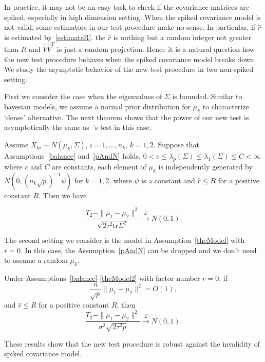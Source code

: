 In practice, it may not be an easy task to check if the covariance matrices are spiked, especially in high dimension setting.
When the spiked covariance model is not valid,
some estimators in our test procedure make no sense.
In particular, if $\hat{r}$ is estimated by~\eqref{estimateR}.
the $\hat{r}$ is nothing but a random integer not greater than $R$ and $\hat{V}\hat{V}^T$ is just a random projection.
Hence it is a natural question how the new test procedure behaves when the spiked covariance model breaks down.
We study the asymptotic behavior of the new test procedure in two non-spiked setting.

First we consider the case  when the eigenvalues of $\Sigma$ is bounded.
Similar to bayesian models, we assume a normal prior distribution for $\mu_k$ to characterize `dense' alternative.
The next theorem shows that  the power of our new test is asymptotically the same as~\cite{Chen2010A}'s test in this case.


\begin{theorem}\label{sameTheorem}
   Assume $X_{ki}\sim N(\mu_k,\Sigma)$,  $i=1,\ldots,n_k$, $k=1,2$.
    Suppose that Assumptions~\ref{balance} and~\ref{pAndN} holds, $0<c\leq\lambda_p(\Sigma)\leq\lambda_1(\Sigma)\leq C<\infty$ where $c$ and $C$ are constants, each element of $\mu_k$ is independently generated by $N(0,{(n_k\sqrt{p})}^{-1}\psi)$ for $k=1,2$, where $\psi$ is a constant and  $\hat{r}\leq R$ for a positive constant $R$.
    Then we have
    
\begin{equation*}
    \frac{T_2-\|\mu_1-\mu_2\|^2}{\sqrt{2\tau^2 \mathrm{tr}\Sigma^2}} \xrightarrow{\mathcal{L}} N(0,1).
\end{equation*}
\end{theorem}

The second setting we consider is the model in Assumption~\ref{theModel} with $r=0$.
In this case, the Assumption~\ref{pAndN} can be dropped and we don't need to assume a random $\mu_k$.

\begin{theorem}\label{sameTheorem2}
    Under Assumptions~\ref{balance}-\ref{theModel2} with factor number $r=0$, if
    $$
    \frac{n}{\sqrt{p}}\|\mu_1-\mu_2\|^2=O(1),
    $$
    and $\hat{r}\leq R$ for a positive constant $R$,
    then
    $$
    \frac{T_2-\|\mu_1-\mu_2\|^2}{\sigma^2\sqrt{2\tau^2 p}}\xrightarrow{\mathcal{L}} N(0,1).
    $$
\end{theorem}
These results show that the new test procedure is robust against the invalidity of spiked covariance model.


